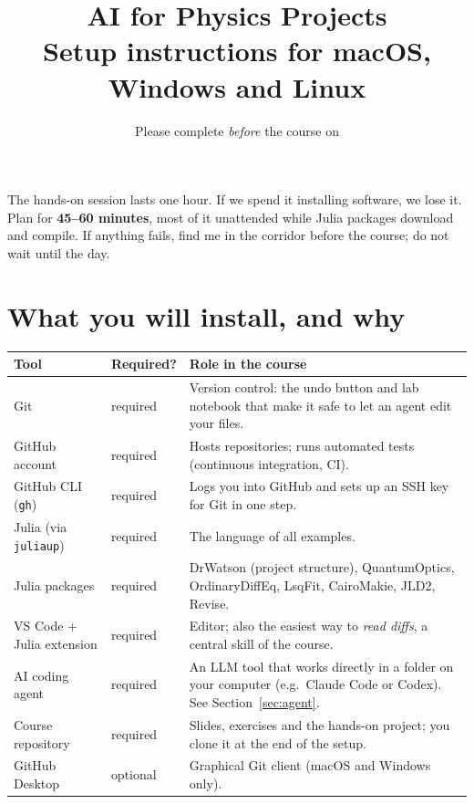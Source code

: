 \documentclass[11pt,a4paper]{article}
\title{\textbf{AI for Physics Projects}\\[4pt]
\large Setup instructions for macOS, Windows and Linux}
\author{}
\date{Please complete \emph{before} the course on \coursedate}
\newcommand{\cmd}[1]{\texttt{#1}}
\begin{document}
\maketitle
\vspace{-1.5em}

\begin{note}
The hands-on session lasts one hour. If we spend it installing software, we lose it.
Plan for \textbf{45--60 minutes}, most of it unattended while Julia packages
download and compile. If anything fails, find me in the corridor
before the course; do not wait until the day.
\end{note}

\tableofcontents

\section{What you will install, and why}

\begin{center}
\renewcommand{\arraystretch}{1.25}
\begin{tabularx}{\textwidth}{@{}l l X@{}}
\toprule
\textbf{Tool} & \textbf{Required?} & \textbf{Role in the course} \\
\midrule
Git              & required & Version control: the undo button and lab notebook that make it safe to let an agent edit your files. \\
GitHub account   & required & Hosts repositories; runs automated tests (continuous integration, CI). \\
GitHub CLI (\cmd{gh}) & required & Logs you into GitHub and sets up an SSH key for Git in one step. \\
Julia (via \cmd{juliaup}) & required & The language of all examples. \\
Julia packages   & required & DrWatson (project structure), QuantumOptics, OrdinaryDiffEq, LsqFit, CairoMakie, JLD2, Revise. \\
VS Code + Julia extension & required & Editor; also the easiest way to \emph{read diffs}, a central skill of the course. \\
AI coding agent  & required & An LLM tool that works directly in a folder on your computer (e.g.\ Claude Code or Codex). See Section~\ref{sec:agent}. \\
Course repository & required & Slides, exercises and the hands-on project; you clone it at the end of the setup. \\
GitHub Desktop   & optional & Graphical Git client (macOS and Windows only). \\
\bottomrule
\end{tabularx}
\end{center}
\end{document}
